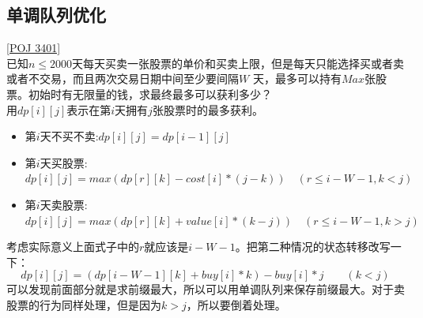 \subsection{单调队列优化}
\underline{[POJ 3401]} \\

已知$n\leq 2000$天每天买卖一张股票的单价和买卖上限，但是每天只能选择买或者卖或者不交易，而且两次交易日期中间至少要间隔$W$ 天，最多可以持有$Max$张股票。初始时有无限量的钱，求最终最多可以获利多少？ \\

用$dp[i][j]$表示在第$i$天拥有$j$张股票时的最多获利。
\begin{itemize}
\item 第$i$天不买不卖:$dp[i][j]=dp[i - 1][j]$
\item 第$i$天买股票:$dp[i][j]=max(dp[r][k]-cost[i]*(j-k))\quad (r\leq i - W - 1,k< j)$
\item 第$i$天卖股票:$dp[i][j]=max(dp[r][k]+value[i]*(k-j))\quad (r\leq i - W - 1,k> j)$
\end{itemize}
考虑实际意义上面式子中的$r$就应该是$i-W-1$。把第二种情况的状态转移改写一下：
$$
dp[i][j]=(dp[i-W-1][k]+buy[i]*k)-buy[i]*j \qquad (k< j)
$$
可以发现前面部分就是求前缀最大，所以可以用单调队列来保存前缀最大。对于卖股票的行为同样处理，但是因为$k>j$，所以要倒着处理。
